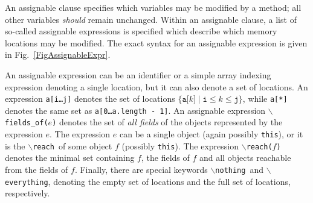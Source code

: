 \documentclass[a4paper]{llncs}
\newcommand{\jml}{\textsc{Jml}}
\newcommand{\java}{\textsc{Java}}
\newcommand{\fieldsofarg}[1]{\texttt{\(\backslash\)fields\_of(#1)}}
\newcommand{\reach}{\texttt{\(\backslash\)reach}}
\newcommand{\reacharg}[1]{\texttt{\(\backslash\)reach(#1)}}
\newcommand{\nothing}{\texttt{\(\backslash\)nothing}}
\newcommand{\everything}{\texttt{\(\backslash\)everything}}
\begin{document}
An assignable clause specifies which variables may 
be modified by a method; all other variables \emph{should} remain
unchanged. Within an assignable clause, a list of so-called assignable 
expressions is specified which describe which memory locations may be
modified. The exact syntax for an assignable
expression is given in Fig.~\ref{FigAssignableExpr}.


An assignable expression can be an identifier or a simple array
indexing expression denoting a single location, but it can also denote
a set of locations. An expression
\texttt{a[i\dots j]} denotes the set of locations
\(\{\texttt{a[}k\texttt{]}\mid \texttt{i} \leq k \leq \texttt{j}\}\), while
\texttt{a[*]} denotes the same set as \texttt{a[0\dots a.length - 1]}.
An assignable expression \fieldsofarg{\(e\)} denotes the set of
\emph{all fields} of the objects represented by the expression \(e\).
The expression \(e\) can be a single object (again possibly
\texttt{this}), or it is the \reach\ of some object \(f\) (possibly
\texttt{this}). The expression \reacharg{\(f\)} denotes the minimal 
set containing \(f\), the fields of \(f\) and all objects reachable
from the fields of \(f\).  Finally, there are special keywords
\nothing\ and \everything, denoting the empty set of locations and the 
full set of locations, respectively.

\end{document}
